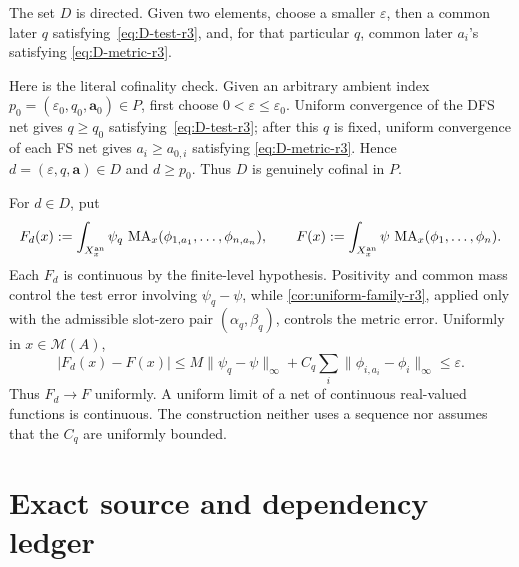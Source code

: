 \documentclass[11pt]{article}
\newcommand{\MA}{\operatorname{MA}}
\newcommand{\cM}{\mathcal M}
\newcommand{\eps}{\varepsilon}
\newcommand{\norm}[1]{\lVert#1\rVert}
\newcommand{\abs}[1]{\lvert#1\rvert}
\begin{document}
The set $D$ is directed.  Given two elements, choose a smaller
$\eps$, then a common later $q$ satisfying~\eqref{eq:D-test-r3}, and,
for that particular $q$, common later $a_i$'s satisfying
\eqref{eq:D-metric-r3}.

Here is the literal cofinality check.  Given an arbitrary ambient index
$p_0=(\eps_0,q_0,\mathbf a_0)\in P$, first choose
$0<\eps\leq\eps_0$.  Uniform convergence of the DFS net gives
$q\geq q_0$ satisfying~\eqref{eq:D-test-r3}; after this $q$ is fixed,
uniform convergence of each FS net gives $a_i\geq a_{0,i}$ satisfying
\eqref{eq:D-metric-r3}.  Hence
$d=(\eps,q,\mathbf a)\in D$ and $d\geq p_0$.  Thus $D$ is genuinely
cofinal in $P$.

For $d\in D$, put
\[
 F_d(x):=\int_{X_x^{\rm an}}\psi_q\,
 \MA_x(\phi_{1,a_1},\ldots,\phi_{n,a_n}),
 \qquad
 F(x):=\int_{X_x^{\rm an}}\psi\,
 \MA_x(\phi_1,\ldots,\phi_n).
\]
Each $F_d$ is continuous by the finite-level hypothesis.  Positivity and
common mass control the test error involving $\psi_q-\psi$, while
\cref{cor:uniform-family-r3}, applied only with the admissible
slot-zero pair $(\alpha_q,\beta_q)$, controls the metric error.  Uniformly
in $x\in\cM(A)$,
\[
 \abs{F_d(x)-F(x)}
 \leq M\norm{\psi_q-\psi}_\infty
 +C_q\sum_i\norm{\phi_{i,a_i}-\phi_i}_\infty
 \leq\eps.
\]
Thus $F_d\to F$ uniformly.  A uniform limit of a net of continuous
real-valued functions is continuous.  The construction neither uses a
sequence nor assumes that the $C_q$ are uniformly bounded.

\section{Exact source and dependency ledger}
\end{document}
